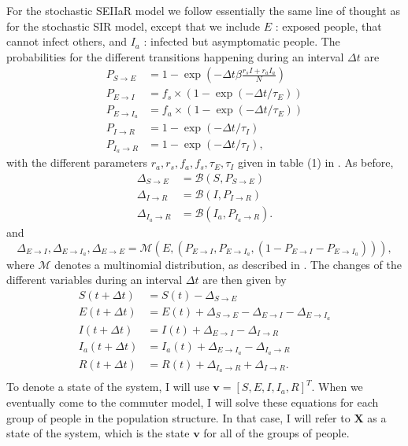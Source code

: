 For the stochastic SEIIaR model we follow essentially the same line of thought as for the stochastic SIR model, except that we include $E$ : exposed people, that cannot infect others, and $I_a$ : infected but asymptomatic people. The probabilities for the different transitions happening during an interval $\Delta t$ are
\begin{subequations}
	\begin{align}
		P_{S\to E} &= 1- \exp{\left(-\Delta t \beta \frac{r_s I + r_a I_a}{N}\right)} \\
		P_{E\to I} &=  f_s \times (1- \exp{(-\Delta t /\tau_E)}) \\
		P_{E\to I_a} &= f_a \times (1- \exp{(-\Delta t/\tau_E)}) \\
		P_{I\to R} &= 1- \exp{(-\Delta t /\tau_I)} \\
		P_{I_a\to R} &= 1- \exp{(-\Delta t/\tau_I)}, 
	\end{align}
\end{subequations}
with the different parameters $r_a,r_s,f_a,f_s,\tau_E,\tau_I$ given in table (1) in \cite{sheet}. As before, 
\begin{subequations}
	\begin{align*}
		\Delta_{S\to E  } &= \mathcal{B}(S,P_{S \to E}) \\
		\Delta_{I\to R  } &= \mathcal{B}(I,P_{I \to R}) \\
		\Delta_{I_a\to R} &= \mathcal{B}(I_a,P_{I_a \to R}).
	\end{align*}
\end{subequations}
and 
\begin{equation}
	\Delta_{E \to I}, \Delta_{E \to I_a}, \Delta_{E \to E} = \mathcal{M}(E,(P_{E\to I},P_{E\to I_a}, (1- P_{E\to I} - P_{E\to I_a}))),
\end{equation}
where $\mathcal{M}$ denotes a multinomial distribution, as described in \cite{sheet}. The changes of the different variables during an interval $\Delta t$ are then given by
\begin{subequations}
	\begin{align}
		S(t + \Delta t) &= S(t) - \Delta_{S\to E} \\
		E(t + \Delta t) &= E(t) + \Delta_{S\to E} - \Delta_{E\to I} - \Delta_{E \to I_a} \\
		I(t + \Delta t) &= I(t) + \Delta_{E\to I} - \Delta_{I\to R} \\
		I_a(t + \Delta t) &= I_a(t) + \Delta_{E\to I_a} - \Delta_{I_a\to R} \\
		R(t + \Delta t) &= R(t) + \Delta_{I_a \to R} + \Delta_{I \to R}. \\
	\end{align}
\end{subequations}
To denote a state of the system, I will use $\mathbf{v} = [S,E,I,I_a,R]^T$. When we eventually come to the commuter model, I will solve these equations for each group of people in the population structure. In that case, I will refer to $\mathbf{X}$ as a state of the system, which is the state $\mathbf{v}$ for all of the groups of people.  

\vspace{1cm}